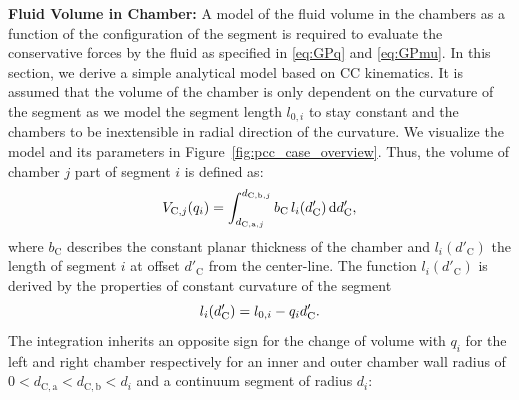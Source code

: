\textbf{Fluid Volume in Chamber:}
A model of the fluid volume in the chambers as a function of the configuration of the segment is required to evaluate the conservative forces by the fluid as specified in \eqref{eq:GPq} and \eqref{eq:GPmu}. In this section, we derive a simple analytical model based on \gls{CC} kinematics.
It is assumed that the volume of the chamber is only dependent on the curvature of the segment as we model the segment length $l_{0,i}$ to stay constant and the chambers to be inextensible in radial direction of the curvature. We visualize the model and its parameters in Figure~\ref{fig:pcc_case_overview}. Thus, the volume of chamber $j$ part of segment $i$ is defined as:
\begin{equation}\small
    V_{\mathrm{C},j}(q_i) = \int_{d_{\mathrm{C},\mathrm{a},j}}^{d_{\mathrm{C},\mathrm{b},j}} b_\mathrm{C} \, l_i(d_\mathrm{C}') \, \mathrm{d}d_\mathrm{C}',
\end{equation}
where $b_\mathrm{C}$ describes the constant planar thickness of the chamber and $l_i(d'_\mathrm{C})$ the length of segment $i$ at offset $d'_\mathrm{C}$ from the center-line. 
The function $l_i(d'_\mathrm{C})$ is derived by the properties of constant curvature of the segment
\begin{equation}\small
    l_i(d'_\mathrm{C}) = l_{0,i} - q_i d'_\mathrm{C}.
\end{equation}
The integration inherits an opposite sign for the change of volume with $q_i$ for the left and right chamber respectively for an inner and outer chamber wall radius of $0 < d_{\mathrm{C},\mathrm{a}} < d_{\mathrm{C},\mathrm{b}} < d_i$ and a continuum segment of radius $d_i$:

